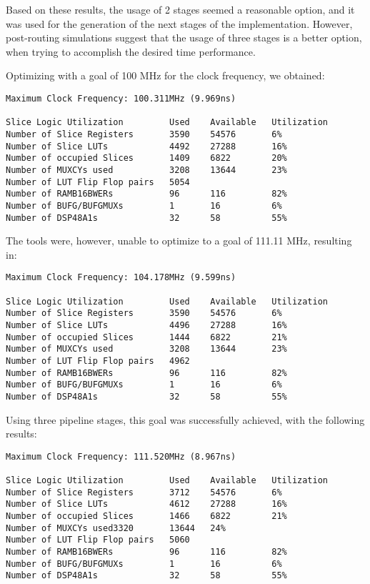 \documentclass[12pt]{article}
\begin{document}
Based on these results, the usage of 2 stages seemed a reasonable option, and it was used for the
generation of the next stages of the implementation. However, post-routing simulations suggest that
the usage of three stages is a better option, when trying to accomplish the desired time
performance.

Optimizing with a goal of 100 MHz for the clock frequency, we obtained:

\begin{verbatim}
Maximum Clock Frequency: 100.311MHz (9.969ns)

Slice Logic Utilization         Used    Available   Utilization
Number of Slice Registers       3590    54576       6% 
Number of Slice LUTs            4492    27288       16%  
Number of occupied Slices       1409    6822        20%
Number of MUXCYs used           3208    13644       23% 
Number of LUT Flip Flop pairs   5054
Number of RAMB16BWERs           96      116         82%
Number of BUFG/BUFGMUXs         1       16          6%
Number of DSP48A1s              32      58          55%
\end{verbatim}

The tools were, however, unable to optimize to a goal of 111.11 MHz, resulting in:
 
\begin{verbatim}
Maximum Clock Frequency: 104.178MHz (9.599ns)

Slice Logic Utilization         Used    Available   Utilization
Number of Slice Registers       3590    54576       6% 
Number of Slice LUTs            4496    27288       16% 
Number of occupied Slices       1444    6822        21%
Number of MUXCYs used           3208    13644       23%
Number of LUT Flip Flop pairs   4962
Number of RAMB16BWERs           96      116         82%
Number of BUFG/BUFGMUXs         1       16          6% 
Number of DSP48A1s              32      58          55%
\end{verbatim}

Using three pipeline stages, this goal was successfully achieved, with the following results:

\begin{verbatim}
Maximum Clock Frequency: 111.520MHz (8.967ns)

Slice Logic Utilization         Used    Available   Utilization
Number of Slice Registers       3712    54576       6%
Number of Slice LUTs            4612    27288       16%
Number of occupied Slices       1466    6822        21%
Number of MUXCYs used3320       13644   24%
Number of LUT Flip Flop pairs   5060
Number of RAMB16BWERs           96      116         82% 
Number of BUFG/BUFGMUXs         1       16          6% 
Number of DSP48A1s              32      58          55%
\end{verbatim}
\end{document}
